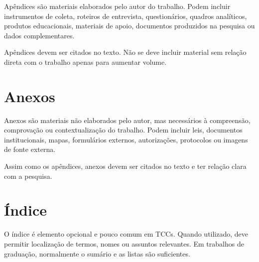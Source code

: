 Apêndices são materiais elaborados pelo autor do trabalho. Podem incluir instrumentos de coleta, roteiros de entrevista, questionários, quadros analíticos, produtos educacionais, materiais de apoio, documentos produzidos na pesquisa ou dados complementares.

Apêndices devem ser citados no texto. Não se deve incluir material sem relação direta com o trabalho apenas para aumentar volume.

\section{Anexos}

Anexos são materiais não elaborados pelo autor, mas necessários à compreensão, comprovação ou contextualização do trabalho. Podem incluir leis, documentos institucionais, mapas, formulários externos, autorizações, protocolos ou imagens de fonte externa.

Assim como os apêndices, anexos devem ser citados no texto e ter relação clara com a pesquisa.

\section{Índice}

O índice é elemento opcional e pouco comum em TCCs. Quando utilizado, deve permitir localização de termos, nomes ou assuntos relevantes. Em trabalhos de graduação, normalmente o sumário e as listas são suficientes.


